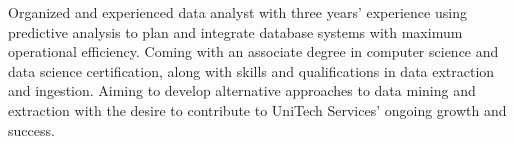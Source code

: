 \documentclass[letter,10pt]{article}
\begin{document}

Organized and experienced data analyst with three years' experience using predictive analysis to plan and integrate database systems with maximum operational efficiency. Coming with an associate degree in computer science and data science certification, along with skills and qualifications in data extraction and ingestion. Aiming to develop alternative approaches to data mining and extraction with the desire to contribute to UniTech Services' ongoing growth and success.
\end{document}
